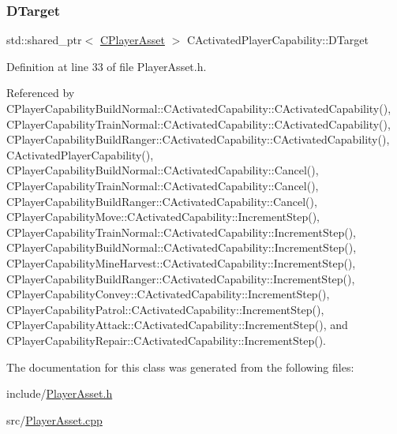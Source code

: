 \hypertarget{classCActivatedPlayerCapability_a8a1cf50b6501bcfd55af0c935828e395}{}\label{classCActivatedPlayerCapability_a8a1cf50b6501bcfd55af0c935828e395} 
\subsubsection{\texorpdfstring{D\+Target}{DTarget}}
{\footnotesize\ttfamily std\+::shared\+\_\+ptr$<$ \hyperlink{classCPlayerAsset}{C\+Player\+Asset} $>$ C\+Activated\+Player\+Capability\+::\+D\+Target\hspace{0.3cm}{\ttfamily [protected]}}



Definition at line 33 of file Player\+Asset.\+h.



Referenced by C\+Player\+Capability\+Build\+Normal\+::\+C\+Activated\+Capability\+::\+C\+Activated\+Capability(), C\+Player\+Capability\+Train\+Normal\+::\+C\+Activated\+Capability\+::\+C\+Activated\+Capability(), C\+Player\+Capability\+Build\+Ranger\+::\+C\+Activated\+Capability\+::\+C\+Activated\+Capability(), C\+Activated\+Player\+Capability(), C\+Player\+Capability\+Build\+Normal\+::\+C\+Activated\+Capability\+::\+Cancel(), C\+Player\+Capability\+Train\+Normal\+::\+C\+Activated\+Capability\+::\+Cancel(), C\+Player\+Capability\+Build\+Ranger\+::\+C\+Activated\+Capability\+::\+Cancel(), C\+Player\+Capability\+Move\+::\+C\+Activated\+Capability\+::\+Increment\+Step(), C\+Player\+Capability\+Train\+Normal\+::\+C\+Activated\+Capability\+::\+Increment\+Step(), C\+Player\+Capability\+Build\+Normal\+::\+C\+Activated\+Capability\+::\+Increment\+Step(), C\+Player\+Capability\+Mine\+Harvest\+::\+C\+Activated\+Capability\+::\+Increment\+Step(), C\+Player\+Capability\+Build\+Ranger\+::\+C\+Activated\+Capability\+::\+Increment\+Step(), C\+Player\+Capability\+Convey\+::\+C\+Activated\+Capability\+::\+Increment\+Step(), C\+Player\+Capability\+Patrol\+::\+C\+Activated\+Capability\+::\+Increment\+Step(), C\+Player\+Capability\+Attack\+::\+C\+Activated\+Capability\+::\+Increment\+Step(), and C\+Player\+Capability\+Repair\+::\+C\+Activated\+Capability\+::\+Increment\+Step().



The documentation for this class was generated from the following files\+:\begin{DoxyCompactItemize}
\item 
include/\hyperlink{PlayerAsset_8h}{Player\+Asset.\+h}\item 
src/\hyperlink{PlayerAsset_8cpp}{Player\+Asset.\+cpp}\end{DoxyCompactItemize}
